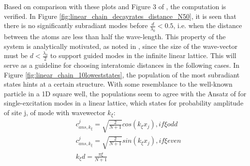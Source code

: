 \documentclass{article}
\begin{document}
Based on comparison with these plots and Figure 3 of \cite{Asenjo}, the computation is verified. In Figure \ref{fig:linear_chain_decayrates_distance_N50}, it is seen that there is no significantly subradiant modes before $\frac{d}{\lambda_0} < 0.5$, i.e. when the distance between the atoms are less than half the wave-length. This property of the system is analytically motivated, as noted in \cite[Section III.A]{Asenjo}, since the size of the wave-vector must be $d < \frac{\lambda_0}{2}$ to support guided modes in the infinite linear lattice. This will serve as a guideline for choosing interatomic distances in the following cases. In Figure \ref{fig:linear_chain_10loweststates}, the population of the most subradiant states hints at a certain structure. With some resemblance to the well-known particle in a 1D square well, the populations seem to agree with the Ansatz of \cite[Section III.B.1]{Asenjo} for single-excitation modes in a linear lattice, which states for probability amplitude of site j, of mode with wavewector $k_\xi$: 
\begin{equation}\label{eq:ansatz}
    \begin{split}
        & c^j_{ans,k_\xi} = \sqrt{\frac{2}{N + 1}} cos(k_\xi x_j), if \xi odd \\
        & c^j_{ans,k_\xi} = \sqrt{\frac{2}{N + 1}} sin(k_\xi x_j), if \xi even \\
        & k_\xi d = \frac{\pi \xi}{N + 1}
    \end{split}
\end{equation}
\end{document}
